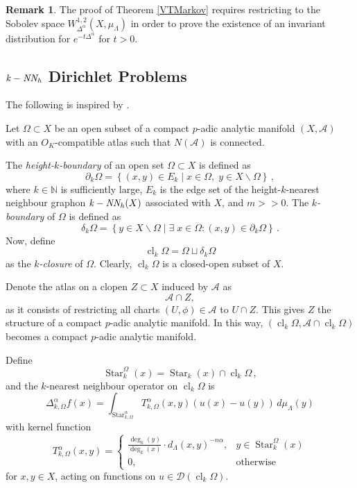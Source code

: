 \documentclass[a4paper,draft]{ZbRad}
\theoremstyle{plain}
\theoremstyle{definition}
\newtheorem{rem}{Remark}[section]
\numberwithin{equation}{section}
\renewcommand{\setminus}{\smallsetminus}
\newcommand{\mathset}[1]{{\left\{#1\right\}}}
\DeclareMathOperator{\Star}{Star}
\DeclareMathOperator{\kNNh}{\it{k-NN_h}}
\DeclareMathOperator{\closure}{cl}
\begin{document}
\begin{rem}
The proof of Theorem \ref{VTMarkov} requires restricting to the Sobolev
space $W^{1,2}_{\Delta^\alpha}(X,\mu_\Lambda)$ in order to prove the existence of an invariant distribution
for $e^{-t\Delta^\alpha}$ for $t > 0$.
\end{rem}
\subsection{$\kNNh$ Dirichlet Problems}


The following is inspired by \cite{Kochubei2023}.
\newline

Let $\Omega\subset X$ be an open subset of a compact $p$-adic analytic manifold
$(X,\mathcal{A})$ with an $O_K$-compatible atlas such that $N(\mathcal{A})$ is connected.
\newline

The \emph{height-$k$-boundary} of an open set $\Omega\subset X$ is defined as
\[
\partial_k\Omega = \mathset{(x,y)\in E_k\mid  x \in\Omega,\; y \in X \setminus\Omega}\,,
\]
where $k\in\mathbb{N}$ is sufficiently large, $E_k$ is the edge set of 
the height-$k$-nearest neighbour graphon $\kNNh (X)$ associated with $X$, and
$m >> 0$.
The \emph{$k$-boundary} of $\Omega$ is defined as
\[
\delta_k\Omega
=\mathset{y\in X\setminus\Omega\mid\exists\;x\in\Omega\colon(x,y)\in\partial_k\Omega}\,.
\]
Now, define
\[
\closure_k\Omega = \Omega\sqcup\delta_k\Omega
\]
as the \emph{$k$-closure} of $\Omega$. Clearly, $\closure_k\Omega$ is a closed-open subset of $X$.
\newline

Denote the atlas on a clopen $Z\subset X$ induced by $\mathcal{A}$ as
\[
\mathcal{A}\cap Z,
\]
as it consists of restricting all charts $(U,\phi)\in\mathcal{A}$ to $U \cap Z$. This gives $Z$ the
structure of a compact $p$-adic analytic manifold. In this way, $(\closure_k\Omega, \mathcal{A}\cap\closure_k\Omega)$
becomes a compact $p$-adic analytic manifold.
\newline

Define
\[
\Star_k^\Omega(x) = \Star_k(x)\cap\closure_k\Omega\,,
\]
and the $k$-nearest neighbour operator on $\closure_k\Omega$ is
\[
\Delta_{k,\Omega}^\alpha f(x)
=\int_{\Star_{k,\Omega}^\alpha}T_{k,\Omega}^\alpha(x,y)(u(x)-u(y))\,d\mu_\Lambda(y)
\]
with kernel function
\[
T_{k,\Omega}^\alpha(x,y)=\begin{cases}
\frac{\displaystyle\deg_k(y)}{\displaystyle\deg_k(x)}\cdot d_\Lambda(x,y)^{-n\alpha},&y\in\Star_{k}^{\Omega}(x)
\\
0,&\text{otherwise}
\end{cases}
\]
for $x,y\in X$, acting on functions on $u\in\mathcal{D}(\closure_k\Omega)$.
\newline
\end{document}
